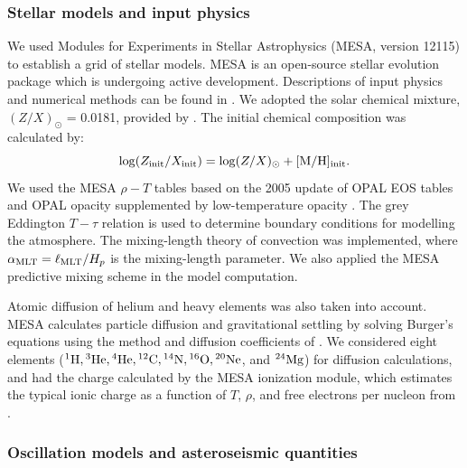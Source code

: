 \documentclass[fleqn,usenatbib]{mnras}
\begin{document}
\subsubsection{Stellar models and input physics}\label{subsec:stellar_model}

We used Modules for Experiments in Stellar Astrophysics
(\textsc{MESA}, version 12115) to establish a grid of stellar models. 
\textsc{MESA} is an open-source stellar evolution package which is undergoing active development. 
Descriptions of input physics and numerical methods
can be found in \citet{Paxton.Bildsten.ea2011, Paxton.Cantiello.ea2013, Paxton.Marchant.ea2015, Paxton.Schwab.ea2018, Paxton.Smolec.ea2019}.
We adopted the solar chemical mixture, $(Z/X)_{\odot}$ = 0.0181,
 provided by \citet{Asplund.Grevesse.ea2009}. 
The initial chemical composition was calculated by:
%
\begin{equation}
\log (Z_{\rm{init}}/X_{\rm{init}}) = \log (Z/X)_{\odot} + \rm{[M/H]_{init}}.  \\
\end{equation}
%
We used the \textsc{MESA} $\rho-T$ tables based on the 2005
update of OPAL EOS tables \citep{Rogers.Nayfonov2002} and OPAL opacity
supplemented by low-temperature opacity \citep{Ferguson.Alexander.ea2005}. The grey Eddington $T-\tau$ relation is used to determine boundary conditions for modelling the atmosphere. The mixing-length theory of convection was implemented, where 
$\alpha_{\rm MLT} = \ell_{\rm MLT}/H_p$ is the mixing-length parameter. 
We also applied the \textsc{MESA} predictive mixing scheme \citep{Paxton.Schwab.ea2018, Paxton.Smolec.ea2019} in the model computation. 

Atomic diffusion of helium and heavy elements was also taken into account. \textsc{MESA} calculates particle diffusion and gravitational settling by solving Burger's equations using the method
and diffusion coefficients of \citet{Thoul.Bahcall.ea1994}. We considered eight elements (${}^1{\rm H}, {}^3{\rm He}, {}^4{\rm He}, {}^{12}{\rm C}, {}^{14}{\rm N}, {}^{16}{\rm O}, {}^{20}{\rm Ne}$, and ${}^{24}{\rm Mg}$)
for diffusion calculations, and had the charge calculated by the \textsc{MESA} ionization module, which estimates the typical ionic charge as a function of $T$, $\rho$, and free electrons per nucleon from \citet{Paquette.Pelletier.ea1986}.

\subsubsection{Oscillation models and asteroseismic quantities}\label{subsec:seismo_model}
\end{document}
